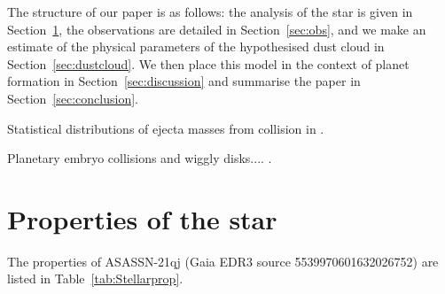 \documentclass{aa}
\begin{document}
   The structure of our paper is as follows: the analysis of the star is given in Section~\ref{sec:star}, the observations are detailed in Section~\ref{sec:obs}, and we make an estimate of the physical parameters of the hypothesised dust cloud in Section~\ref{sec:dustcloud}.
   We then place this model in the context of planet formation in Section~\ref{sec:discussion} and summarise the paper in Section~\ref{sec:conclusion}.


Statistical distributions of ejecta masses from collision in \citet{Crespi21}.

Planetary embryo collisions and wiggly disks.... \citet{Watt21}.

\section{Properties of the star}\label{sec:star}

The properties of ASASSN-21qj (Gaia EDR3 source 5539970601632026752) are listed in Table~\ref{tab:Stellarprop}.
\end{document}
